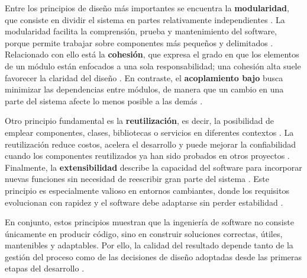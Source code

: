 Entre los principios de diseño más importantes se encuentra la \textbf{modularidad}, que consiste en dividir el sistema en partes relativamente independientes \cite{parnas1972}. La modularidad facilita la comprensión, prueba y mantenimiento del software, porque permite trabajar sobre componentes más pequeños y delimitados \cite{parnas1972}. Relacionado con ello está la \textbf{cohesión}, que expresa el grado en que los elementos de un módulo están enfocados a una sola responsabilidad; una cohesión alta suele favorecer la claridad del diseño \cite{pressman2020}. En contraste, el \textbf{acoplamiento bajo} busca minimizar las dependencias entre módulos, de manera que un cambio en una parte del sistema afecte lo menos posible a las demás \cite{sommerville2016}.

Otro principio fundamental es la \textbf{reutilización}, es decir, la posibilidad de emplear componentes, clases, bibliotecas o servicios en diferentes contextos \cite{booch1994}. La reutilización reduce costos, acelera el desarrollo y puede mejorar la confiabilidad cuando los componentes reutilizados ya han sido probados en otros proyectos \cite{gamma1994}. Finalmente, la \textbf{extensibilidad} describe la capacidad del software para incorporar nuevas funciones sin necesidad de reescribir gran parte del sistema \cite{sommerville2016}. Este principio es especialmente valioso en entornos cambiantes, donde los requisitos evolucionan con rapidez y el software debe adaptarse sin perder estabilidad \cite{pressman2020}.

En conjunto, estos principios muestran que la ingeniería de software no consiste únicamente en producir código, sino en construir soluciones correctas, útiles, mantenibles y adaptables. Por ello, la calidad del resultado depende tanto de la gestión del proceso como de las decisiones de diseño adoptadas desde las primeras etapas del desarrollo \cite{sommerville2016, pressman2020}.
